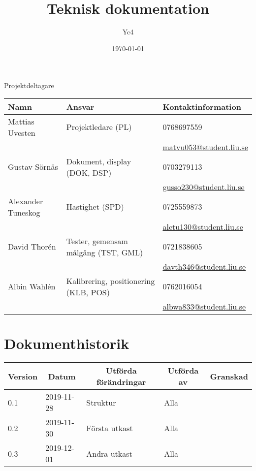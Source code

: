 \documentclass[10pt,oneside,swedish]{lips-no_customer}
\title{Teknisk dokumentation}
\author{Yc4}
\date{\today}
\begin{document}
\maketitle

\cleardoublepage
\makeprojectid

\begin{center}
  \Large Projektdeltagare
\end{center}
\begin{center}
  \begin{tabular}{|l|l|l|}
    \hline
			\textbf{Namn} & \textbf{Ansvar} & \textbf{Kontaktinformation}\\
		\hline
			Mattias Uvesten & Projektledare (PL) & 0768697559\\
			&& \url{matvu053@student.liu.se} \\
    \hline
			Gustav Sörnäs & Dokument, display (DOK, DSP) & 0703279113\\
			&& \url{gusso230@student.liu.se} \\
    \hline
			Alexander Tuneskog & Hastighet (SPD) & 0725559873 \\
			&& \url{aletu130@student.liu.se} \\
    \hline
			David Thorén & Tester, gemensam målgång (TST, GML) & 0721838605 \\
			&& \url{davth346@student.liu.se} \\
    \hline
			Albin Wahlén & Kalibrering, positionering (KLB, POS) & 0762016054 \\
			&& \url{albwa833@student.liu.se} \\
    \hline
  \end{tabular}
\end{center}

\section*{Dokumenthistorik}
\begin{tabular}{p{}|p{}|p{}|p{}|p{}} 
  \multicolumn{1}{c}{\bfseries Version} & 
  \multicolumn{1}{|c}{\bfseries Datum} & 
  \multicolumn{1}{|c}{\bfseries Utförda förändringar} & 
  \multicolumn{1}{|c}{\bfseries Utförda av} & 
  \multicolumn{1}{|c}{\bfseries Granskad}\\
  \hline
		0.1 & 2019-11-28 & Struktur & Alla \\
  \hline
		0.2 & 2019-11-30 & Första utkast & Alla & \\
  \hline
		0.3 & 2019-12-01 & Andra utkast & Alla & \\
  \hline
\end{tabular}
\end{document}
